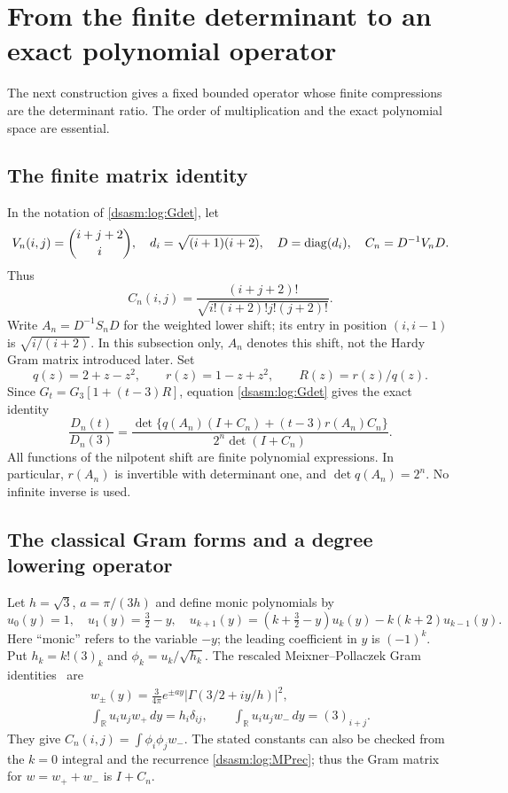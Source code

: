 \documentclass[11pt,letterpaper]{article}
\theoremstyle{remark}\newtheorem{remark}[theorem]{Remark}
\newcommand{\R}{\mathbb R}\newcommand{\C}{\mathbb C}\newcommand{\N}{\mathbb N}
\begin{document}
\section{From the finite determinant to an exact polynomial operator}
\label{dsasm:log:sec:finiteoperator}
The next construction gives a fixed bounded operator whose finite
compressions are the determinant ratio. The order of multiplication
and the exact polynomial space are essential.

\subsection{The finite matrix identity}
In the notation of \eqref{dsasm:log:Gdet}, let
\[
 V_n(i,j)=\binom{i+j+2}{i},\quad d_i=\sqrt{(i+1)(i+2)},\quad
 D=\operatorname{diag}(d_i),\quad C_n=D^{-1}V_nD.
\]
Thus
\[
 C_n(i,j)=\frac{(i+j+2)!}{\sqrt{i!(i+2)!j!(j+2)!}}.
\]
Write $A_n=D^{-1}S_nD$ for the weighted lower shift; its entry in
position $(i,i-1)$ is $\sqrt{i/(i+2)}$. In this subsection only,
$A_n$ denotes this shift, not the Hardy Gram matrix introduced later.
Set
\[
 q(z)=2+z-z^2,\qquad r(z)=1-z+z^2,\qquad R(z)=r(z)/q(z).
\]
Since $G_t=G_3[1+(t-3)R]$, equation \eqref{dsasm:log:Gdet} gives the exact identity
\begin{equation}\label{dsasm:log:finitequotient}
 \frac{D_n(t)}{D_n(3)}
 =\frac{\det\{q(A_n)(I+C_n)+(t-3)r(A_n)C_n\}}
        {2^n\det(I+C_n)}.
\end{equation}
All functions of the nilpotent shift are finite polynomial expressions.
In particular, $r(A_n)$ is invertible with determinant one, and
$\det q(A_n)=2^n$. No infinite inverse is used.

\subsection{The classical Gram forms and a degree lowering operator}
Let $h=\sqrt3$, $a=\pi/(3h)$ and define monic polynomials by
\begin{equation}\label{dsasm:log:MPrec}
 u_0(y)=1,\quad u_1(y)=\tfrac32-y,\quad
 u_{k+1}(y)=(k+\tfrac32-y)u_k(y)-k(k+2)u_{k-1}(y).
\end{equation}
Here ``monic'' refers to the variable $-y$; the leading coefficient
in $y$ is $(-1)^k$. Put $h_k=k!(3)_k$ and $\phi_k=u_k/\sqrt{h_k}$.
The rescaled Meixner--Pollaczek Gram identities~\cite[Equations
(2.4)--(2.6), (3.4a), (3.6)--(3.7)]{ros} are
\begin{equation}\label{dsasm:log:MPgrams}
\begin{gathered}
 w_\pm(y)=\frac3{4\pi}e^{\pm ay}
       |\Gamma(3/2+iy/h)|^2,\\
 \int_{\R}u_i u_j w_+\,dy=h_i\delta_{ij},\qquad
 \int_{\R}u_i u_j w_-\,dy=(3)_{i+j}.
\end{gathered}
\end{equation}
They give $C_n(i,j)=\int\phi_i\phi_jw_-$. The stated constants can
also be checked from the $k=0$ integral and the recurrence
\eqref{dsasm:log:MPrec}; thus the Gram matrix for $w=w_++w_-$ is $I+C_n$.
\end{document}
